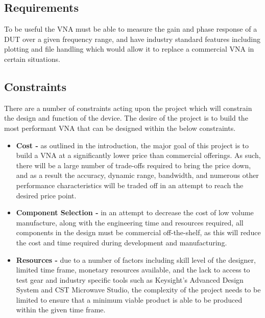 \subsection{Requirements}
\label{subsec:requirements}
To be useful the VNA must be able to measure the gain and phase response of a DUT over a given frequency range, and have industry standard features including plotting and file handling which would allow it to replace a commercial VNA in certain situations. 

\subsection{Constraints}
\label{subsec:contraints}
There are a number of constraints acting upon the project which will constrain the design and function of the device. The desire of the project is to build the most performant VNA that can be designed within the below constraints. 

\begin{itemize}
	\item \textbf{Cost -} as outlined in the introduction, the major goal of this project is to build a VNA at a significantly lower price than commercial offerings. As such, there will be a large number of trade-offs required to bring the price down, and as a result the accuracy, dynamic range, bandwidth, and numerous other performance characteristics will be traded off in an attempt to reach the desired price point.
	\item \textbf{Component Selection -} in an attempt to decrease the cost of low volume manufacture, along with the engineering time and resources required, all components in the design must be commercial off-the-shelf, as this will reduce the cost and time required during development and manufacturing. 
	\item \textbf{Resources -} due to a number of factors including skill level of the designer, limited time frame, monetary resources available, and the lack to access to test gear and industry specific tools such as Keysight's Advanced Design System and CST Microwave Studio, the complexity of the project needs to be limited to ensure that a minimum viable product is able to be produced within the given time frame.   
\end{itemize}

